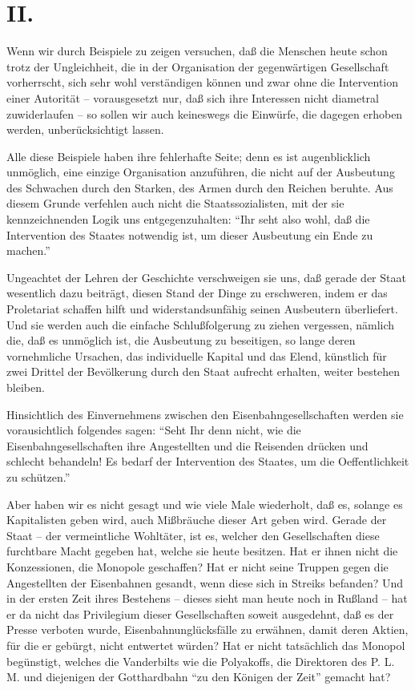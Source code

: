 \documentclass{scrbook}
\begin{document}
\section*{II.}

Wenn wir durch Beispiele zu zeigen versuchen, daß die Menschen heute schon trotz der Ungleichheit, die in der Organisation der gegenwärtigen Gesellschaft vorherrscht, sich sehr wohl verständigen können und zwar ohne die Intervention einer Autorität – vorausgesetzt nur, daß sich ihre Interessen nicht diametral zuwiderlaufen – so sollen wir auch keineswegs die Einwürfe, die dagegen erhoben werden, unberücksichtigt lassen.

Alle diese Beispiele haben ihre fehlerhafte Seite; denn es ist augenblicklich unmöglich, eine einzige Organisation anzuführen, die nicht auf der Ausbeutung des Schwachen durch den Starken, des Armen durch den Reichen beruhte. Aus diesem Grunde verfehlen auch nicht die Staatssozialisten, mit der sie kennzeichnenden Logik uns entgegenzuhalten: ``Ihr seht also wohl, daß die Intervention des Staates notwendig ist, um dieser Ausbeutung ein Ende zu machen.''

Ungeachtet der Lehren der Geschichte verschweigen sie uns, daß gerade der Staat wesentlich dazu beiträgt, diesen Stand der Dinge zu erschweren, indem er das Proletariat schaffen hilft und widerstandsunfähig seinen Ausbeutern überliefert. Und sie werden auch die einfache Schlußfolgerung zu ziehen vergessen, nämlich die, daß es unmöglich ist, die Ausbeutung zu beseitigen, so lange deren vornehmliche Ursachen, das individuelle Kapital und das Elend, künstlich für zwei Drittel der Bevölkerung durch den Staat aufrecht erhalten, weiter bestehen bleiben.

Hinsichtlich des Einvernehmens zwischen den Eisenbahngesellschaften werden sie vorausichtlich folgendes sagen: ``Seht Ihr denn nicht, wie die Eisenbahngesellschaften ihre Angestellten und die Reisenden drücken und schlecht behandeln! Es bedarf der Intervention des Staates, um die Oeffentlichkeit zu schützen.''

Aber haben wir es nicht gesagt und wie viele Male wiederholt, daß es, solange es Kapitalisten geben wird, auch Mißbräuche dieser Art geben wird. Gerade der Staat – der vermeintliche Wohltäter, ist es, welcher den Gesellschaften diese furchtbare Macht gegeben hat, welche sie heute besitzen. Hat er ihnen nicht die Konzessionen, die Monopole geschaffen? Hat er nicht seine Truppen gegen die Angestellten der Eisenbahnen gesandt, wenn diese sich in Streiks befanden? Und in der ersten Zeit ihres Bestehens – dieses sieht man heute noch in Rußland – hat er da nicht das Privilegium dieser Gesellschaften soweit ausgedehnt, daß es der Presse verboten wurde, Eisenbahnunglücksfälle zu erwähnen, damit deren Aktien, für die er gebürgt, nicht entwertet würden? Hat er nicht tatsächlich das Monopol begünstigt, welches die Vanderbilts wie die Polyakoffs, die Direktoren des P. L. M. und diejenigen der Gotthardbahn ``zu den Königen der Zeit'' gemacht hat?
\end{document}

